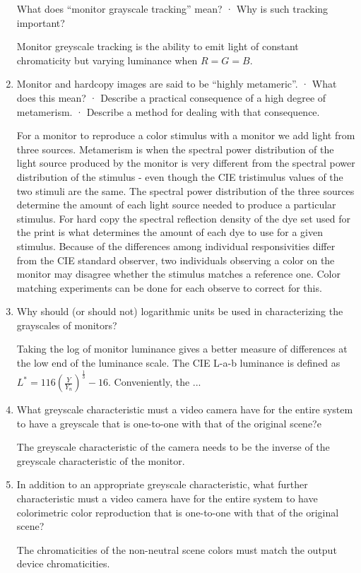 \begin{enumerate}
 What does “monitor grayscale tracking” mean? · Why is such tracking important?
 \par Monitor greyscale tracking is the ability to emit light of constant chromaticity but varying luminance when $R=G=B$.
 \item
 Monitor and hardcopy images are said to be “highly metameric”. · What does this mean? · Describe a practical consequence of a high degree of metamerism. · Describe a method for dealing with that consequence.
 \par For a monitor to reproduce a color stimulus with a monitor we add light from three sources.    Metamerism is when the spectral power distribution of the light source produced by the monitor is very different from the spectral power distribution of the stimulus - even though the CIE tristimulus values of the two stimuli are the same.  The spectral power distribution of the three sources determine the amount of each light source needed to produce a particular stimulus.  For hard copy the spectral reflection density of the dye set used for the print is what determines the amount of each dye to use for a given stimulus.  Because of the differences among individual responsivities differ from the CIE standard observer, two individuals observing a color on the monitor may disagree whether the stimulus matches a reference one.  Color matching experiments can be done for each observe to correct for this.
 \item
 Why should (or should not) logarithmic units be used in characterizing the grayscales of monitors?
 \par Taking the log of monitor luminance gives a better measure of differences at the low end of the luminance scale. The CIE L-a-b luminance is defined as  $L^{*}=116 (\frac{Y}{Y_n})^{\frac{1}{3}} -16 $.  Conveniently, the ...
 \item
 What greyscale characteristic must a video camera have for the entire system to have a greyscale that is one-to-one with that of the original scene?e
 \par The greyscale characteristic of the camera needs to be the inverse of the greyscale characteristic of the monitor.
 \item
  In addition to an appropriate greyscale characteristic, what further characteristic must a video camera have for the entire system to have colorimetric color reproduction that is one-to-one with that of the original scene? \newline
 \par The chromaticities of the non-neutral scene colors must match the output device chromaticities. \newline

\end{enumerate}
